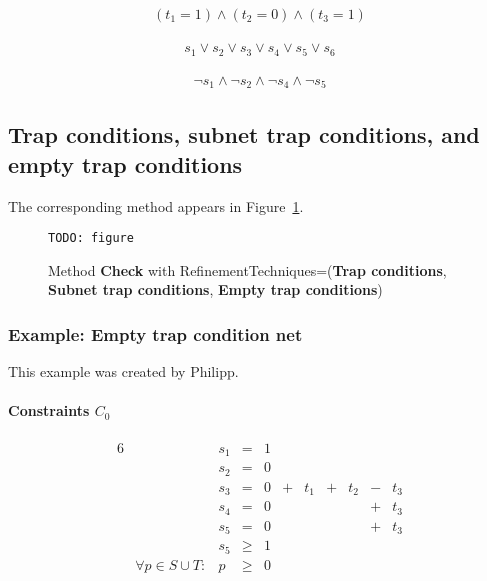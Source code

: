 \documentclass{article}
\begin{document}
\begin{align*}
  (t_1 = 1) \land (t_2 = 0) \land (t_3 = 1)
\end{align*}

\begin{align*}
  s_1 \lor s_2 \lor s_3 \lor s_4 \lor s_5 \lor s_6
\end{align*}

\begin{align*}
  \neg s_1 \land \neg s_2 \land \neg s_4 \land \neg s_5
\end{align*}


\subsection{Trap conditions, subnet trap conditions, and empty trap
  conditions}

The corresponding method appears in
Figure~\ref{fig-method-trap-subnet-empty}.

\begin{figure}[h]
  \verb?TODO: figure?
  \caption{Method {\bf Check} with RefinementTechniques=({\bf Trap
      conditions}, {\bf Subnet trap conditions}, {\bf Empty trap
      conditions})}
  \label{fig-method-trap-subnet-empty}
\end{figure}

\subsubsection{Example: Empty trap condition net}

This example was created by Philipp.

\begin{dot2tex}[dot,options=-tmath]

\end{dot2tex}

\paragraph{Constraints $C_0$}

\begin{alignat*}{6}
&& s_1 &{}={}&   1 &     &     &     &     &     &     \\
&& s_2 &{}={}&   0 &     &     &     &     &     &     \\
&& s_3 &{}={}&   0 &{}+{}& t_1 &{}+{}& t_2 &{}-{}& t_3 \\
&& s_4 &{}={}&   0 &     &     &     &     &{}+{}& t_3 \\
&& s_5 &{}={}&   0 &     &     &     &     &{}+{}& t_3 \\
&& s_5 &{}\ge{}& 1 \\
&\forall p \in S \cup T:& p &{}\ge{}& 0
\end{alignat*}
\end{document}
